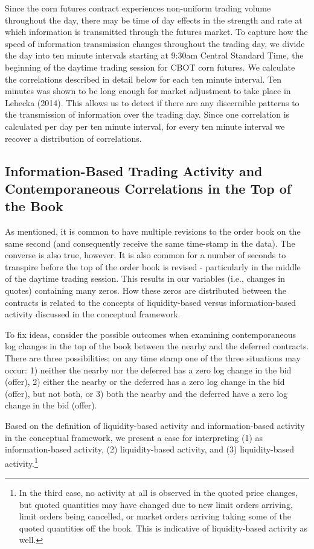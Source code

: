 \documentclass[review,12pt]{elsarticle}
\begin{document}
\begin{linenumbers}
Since the corn futures contract experiences non-uniform trading volume
throughout the day, there may be time of day effects in the strength and
rate at which information is transmitted through the futures market. To
capture how the speed of information transmission changes throughout the
trading day, we divide the day into ten minute intervals starting at
9:30am Central Standard Time, the beginning of the daytime trading
session for CBOT corn futures. We calculate the correlations described
in detail below for each ten minute interval. Ten minutes was shown to
be long enough for market adjustment to take place in Lehecka (2014).
This allows us to detect if there are any discernible patterns to the
transmission of information over the trading day. Since one correlation
is calculated per day per ten minute interval, for every ten minute
interval we recover a distribution of correlations.

\subsection{Information-Based Trading Activity and Contemporaneous
Correlations in the Top of the
Book}\label{information-based-trading-activity-and-contemporaneous-correlations-in-the-top-of-the-book}

As mentioned, it is common to have multiple revisions to the order book
on the same second (and consequently receive the same time-stamp in the
data). The converse is also true, however. It is also common for a
number of seconds to transpire before the top of the order book is
revised - particularly in the middle of the daytime trading session.
This results in our variables (i.e., changes in quotes) containing many
zeros. How these zeros are distributed between the contracts is related
to the concepts of liquidity-based versus information-based activity
discussed in the conceptual framework.

To fix ideas, consider the possible outcomes when examining
contemporaneous log changes in the top of the book between the nearby
and the deferred contracts. There are three possibilities; on any time
stamp one of the three situations may occur: 1) neither the nearby nor
the deferred has a zero log change in the bid (offer), 2) either the
nearby or the deferred has a zero log change in the bid (offer), but not
both, or 3) both the nearby and the deferred have a zero log change in
the bid (offer).

Based on the definition of liquidity-based activity and
information-based activity in the conceptual framework, we present a
case for interpreting (1) as information-based activity, (2)
liquidity-based activity, and (3) liquidity-based activity.\footnote{In
  the third case, no activity at all is observed in the quoted price
  changes, but quoted quantities may have changed due to new limit
  orders arriving, limit orders being cancelled, or market orders
  arriving taking some of the quoted quantities off the book. This is
  indicative of liquidity-based activity as well.}


\end{linenumbers}
\end{document}

